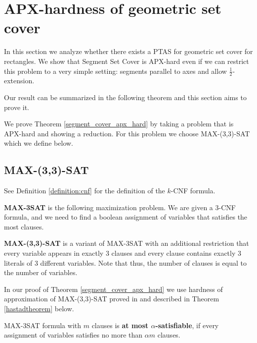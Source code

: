 \chapter{APX-hardness of geometric set cover}
\newcommand{\setCoverInstance}{(\points, \sets)}
\newcommand{\true}{\texttt{true}}
\newcommand{\false}{\texttt{false}}
\newcommand{\opt}{\mathsf{opt}}
\newcommand{\approximate}{\mathsf{approx}^{*}}

\label{chapter:segment_apx}

In this section we analyze whether there exists 
a PTAS for geometric set cover for rectangles.
We show that Segment Set Cover
is APX-hard even if we can restrict this problem
to a very simple setting:
segments parallel to axes and allow $\frac{1}{2}$-extension.

Our result can be summarized in the following
theorem and this section aims to prove it.

\segmentCoverApxHard*

We prove Theorem \ref{segment_cover_apx_hard}
by taking a problem that is APX-hard
and showing a reduction.
For this problem we choose
MAX-(3,3)-SAT which we define below.

\section{MAX-(3,3)-SAT}

See Definition \ref{definition:cnf}
for the definition of the $k$-CNF formula.

\begin{defi}
\textbf{MAX-3SAT} is the following maximization problem. We are given a 3-CNF
formula, and we need to find a boolean assignment of variables
that satisfies the most clauses.
\end{defi}

\begin{defi}
\textbf{MAX-(3,3)-SAT} is a variant of MAX-3SAT with an additional
restriction that every variable appears in exactly 3 clauses
and every clause contains exactly 3 literals of 3 different variables.
Note that thus, the number of clauses is equal to the number of variables.
\end{defi}

In our proof of Theorem \ref{segment_cover_apx_hard} we use
hardness of approximation of MAX-(3,3)-SAT proved
in \cite{hastad} and described in
Theorem \ref{hastadtheorem} below.

\begin{defi}
MAX-3SAT formula with $m$ clauses is \textbf{at most $\alpha$-satisfiable}, if
every assignment of variables satisfies no more than $\alpha m$
clauses. 
\end{defi}

